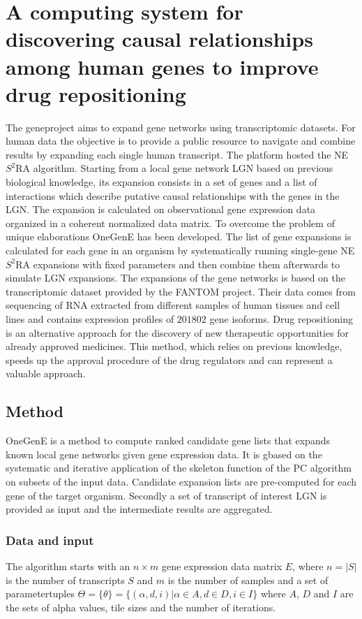 			

\section{A computing system for discovering causal relationships among human genes to improve drug repositioning}
The gene\@home project aims to expand gene networks using transcriptomic datasets.
For human data the objective is to provide a public resource to navigate and combine results by expanding each single human transcript.
The platform hosted the NE$S^2$RA algorithm.
Starting from a local gene network LGN based on previous biological knowledge, its expansion consists in a set of genes and a list of interactions which describe putative causal relationships with the genes in the LGN.
The expansion is calculated on observational gene expression data organized in a coherent normalized data matrix.
To overcome the problem of unique elaborations OneGenE has been developed.
The list of gene expansions is calculated for each gene in an organism by systematically running single-gene NE$S^2$RA expansions with fixed parameters and then combine them afterwards to simulate LGN expansions.
The expansions of the gene networks is based on the transcriptomic dataset provided by the FANTOM project.
Their data comes from sequencing of RNA extracted from different samples of human tissues and cell lines and contains expression profiles of $201802$ gene isoforms.
Drug repositioning is an alternative approach for the discovery of new therapeutic opportunities for already approved medicines.
This method, which relies on previous knowledge, speeds up the approval procedure of the drug regulators and can represent a valuable approach.

	\subsection{Method}
	OneGenE is a method to compute ranked candidate gene lists that expands known local gene networks given gene expression data.
	It is gbased on the systematic and iterative application of the skeleton function of the PC algorithm on subsets of the input data.
	Candidate expansion lists are pre-computed for each gene of the target organism.
	Secondly a set of transcript of interest LGN is provided as input and the intermediate results are aggregated.

		\subsubsection{Data and input}
		The algorithm starts with an $n\times m$ gene expression data matrix $E$, where $n=|S|$ is the number of transcripts $S$ and $m$ is the number of samples and a set of parametertuples $\Theta = \{\theta\} = \{(\alpha, d, i)|\alpha\in A, d\in D, i\in I\}$ where $A$, $D$ and $I$ are the sets of alpha values, tile sizes and the number of iterations.

